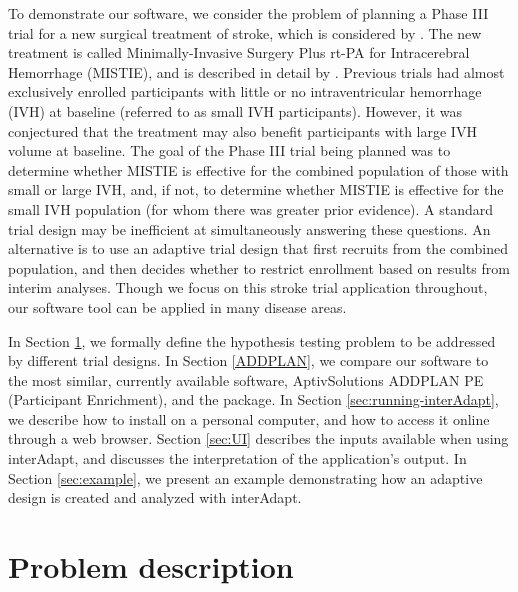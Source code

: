 \documentclass[article]{jss}
\begin{document}
To demonstrate our software, we consider the problem of 
 planning a Phase III trial for a new surgical treatment of stroke, which is considered by \cite{Rosenblum2013AdaptMISTIE}.
The new treatment is  called Minimally-Invasive Surgery Plus rt-PA for Intracerebral Hemorrhage (MISTIE), and is described in detail by \cite{MISTIE_prelim2008}. 
Previous trials had almost exclusively enrolled participants with little or no intraventricular hemorrhage (IVH) at baseline (referred to as small IVH participants).
However, it was conjectured that the treatment may also benefit  participants with large IVH volume at baseline.  
The goal of the Phase III trial being planned was to determine whether MISTIE is effective for the combined population of those with small or large IVH, and, if not, to determine whether MISTIE is effective for the small IVH population (for whom there was greater prior evidence). A  standard trial design  may be inefficient at simultaneously answering these questions.
An alternative is to use an adaptive trial design that  first recruits from the combined population, and then decides whether to restrict enrollment based on results from interim  analyses. %
Though we focus on this stroke trial application throughout, our software tool can be applied in many disease areas.

In Section \ref{sec:problemDescription}, we  formally define the hypothesis testing problem to be addressed by different trial designs. In Section \ref{ADDPLAN}, we compare our software to the most similar, currently available software, AptivSolutions ADDPLAN PE (Participant Enrichment), and the   package. 
In Section \ref{sec:running-interAdapt}, we describe how to install  on a personal computer, and how to access it online through a web browser. Section \ref{sec:UI} describes the inputs available when using \textsf{interAdapt}, and discusses the interpretation of the application's output. In Section \ref{sec:example}, we present an example demonstrating how an adaptive design is created and analyzed with \textsf{interAdapt}. 

\section{Problem description}
\label{sec:problemDescription}
\end{document}
